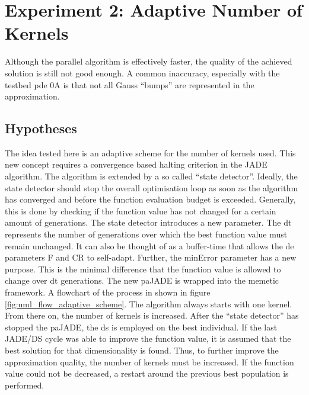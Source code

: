 \documentclass[./\jobname.tex]{subfiles}
\begin{document}
\section {Experiment 2: Adaptive Number of Kernels}
\label{chap:experimet_2}
Although the parallel algorithm is effectively faster, the quality of the achieved solution is still not good enough. A common inaccuracy, especially with the testbed \gls{pde} 0A is that not all Gauss ``bumps'' are represented in the approximation.

\subsection{Hypotheses}
The idea tested here is an adaptive scheme for the number of kernels used. This new concept requires a convergence based halting criterion in the JADE algorithm. The algorithm is extended by a so called ``state detector''. Ideally, the state detector should stop the overall optimisation loop as soon as the algorithm has converged and before the function evaluation budget is exceeded. Generally, this is done by checking if the function value has not changed for a certain amount of generations. The state detector introduces a new parameter. The \gls{dt} represents the number of generations over which the best function value must remain unchanged. It can also be thought of as a buffer-time that allows the \gls{de} parameters F and CR to self-adapt. Further, the minError parameter has a new purpose. This is the minimal difference that the function value is allowed to change over \gls{dt} generations. The new paJADE is wrapped into the memetic framework. A flowchart of the process in shown in figure \ref{fig:uml_flow_adaptive_scheme}. The algorithm always starts with one kernel. From there on, the number of kernels is increased. After the ``state detector'' has stopped the paJADE, the \gls{ds} is employed on the best individual. If the last JADE/DS cycle was able to improve the function value, it is assumed that the best solution for that dimensionality is found. Thus, to further improve the approximation quality, the number of kernels must be increased. If the function value could not be decreased, a restart around the previous best population is performed. 
\end{document}

